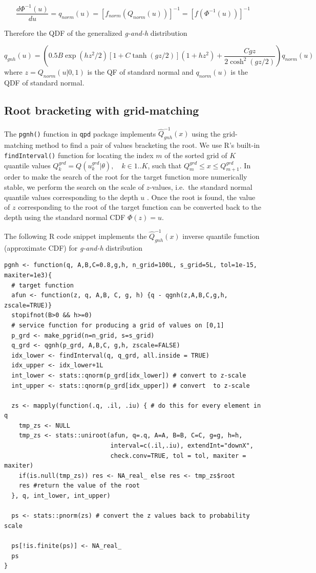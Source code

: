 \documentclass[ba]{imsart}
\numberwithin{equation}{section}
\theoremstyle{plain}
\begin{document}
\[\frac{d\Phi^{-1}(u)}{du}=q_{norm}(u)=[f_{norm}(Q_{norm}(u))]^{-1}=[f(\Phi^{-1}(u))]^{-1}\]

Therefore the QDF of the generalized \emph{g-and-h} distribution

\[
q_{gnh}(u)=\left(0.5B\exp(hz^2/2)[1+C\tanh(gz/2)](1+hz^2)+ \frac{Cgz}{2\cosh^2(gz/2)}\right)q_{norm}(u)
\]
where \(z=Q_{norm}(u|0,1)\) is the QF of standard normal and \(q_{norm}(u)\) is the QDF of standard normal.

\hypertarget{root-bracketing-with-grid-matching}{%
\subsection{Root bracketing with grid-matching}\label{root-bracketing-with-grid-matching}}

The \texttt{pgnh()} function in \texttt{qpd} package \citep{perepolkin2019QpdToolsQuantileparameterized} implements \(\widehat{Q}^{-1}_{gnh}(x)\) using the grid-matching method to find a pair of values bracketing the root. We use R's built-in \texttt{findInterval()} function for locating the index \(m\) of the sorted grid of \(K\) quantile values \(Q^{grd}_k=Q(u^{grd}_k|\theta), \quad k \in 1..K\), such that \(Q^{grd}_{m} \leq x \leq Q^{grd}_{m+1}\). In order to make the search of the root for the target function more numerically stable, we perform the search on the scale of \(z\)-values, i.e.~the standard normal quantile values corresponding to the depth \(u\) \citep{rayner2002NumericalMaximumLikelihood}. Once the root is found, the value of \(z\) corresponding to the root of the target function can be converted back to the depth using the standard normal CDF \(\Phi(z)=u\).

The following R code snippet implements the \(\widehat Q^{-1}_{gnh}(x)\) inverse quantile function (approximate CDF) for \emph{g-and-h} distribution

\begin{verbatim}
pgnh <- function(q, A,B,C=0.8,g,h, n_grid=100L, s_grid=5L, tol=1e-15, maxiter=1e3){
  # target function
  afun <- function(z, q, A,B, C, g, h) {q - qgnh(z,A,B,C,g,h, zscale=TRUE)}
  stopifnot(B>0 && h>=0)
  # service function for producing a grid of values on [0,1]
  p_grd <- make_pgrid(n=n_grid, s=s_grid) 
  q_grd <- qgnh(p_grd, A,B,C, g,h, zscale=FALSE) 
  idx_lower <- findInterval(q, q_grd, all.inside = TRUE)
  idx_upper <- idx_lower+1L
  int_lower <- stats::qnorm(p_grd[idx_lower]) # convert to z-scale
  int_upper <- stats::qnorm(p_grd[idx_upper]) # convert  to z-scale

  zs <- mapply(function(.q, .il, .iu) { # do this for every element in q
    tmp_zs <- NULL
    tmp_zs <- stats::uniroot(afun, q=.q, A=A, B=B, C=C, g=g, h=h, 
                             interval=c(.il,.iu), extendInt="downX", 
                             check.conv=TRUE, tol = tol, maxiter = maxiter)
    if(is.null(tmp_zs)) res <- NA_real_ else res <- tmp_zs$root 
    res #return the value of the root
  }, q, int_lower, int_upper)

  ps <- stats::pnorm(zs) # convert the z values back to probability scale

  ps[!is.finite(ps)] <- NA_real_
  ps
}
\end{verbatim}
\end{document}
